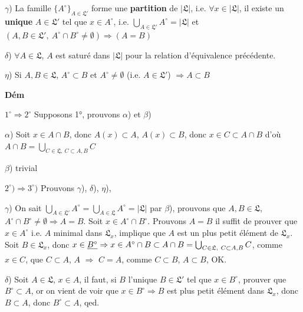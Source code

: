 \documentclass[11pt,a4paper]{article}
\begin{document}
$\gamma$) La famille $\{A^{\circ}\}_{A \in \mathfrak{L}'}$ forme une \textbf{partition} de $|\mathfrak{L}|$, i.e. $\forall x \in |\mathfrak{L}|$, \struck{$\exists$} il existe un \textbf{unique} $A \in \mathfrak{L}'$ tel que $x \in A^{\circ}$, i.e. $\bigcup_{A \in \mathfrak{L}'} A^{\circ} = |\mathfrak{L}|$ et $(A, B \in \mathfrak{L}',\ A^{\circ} \cap B^{\circ} \neq \emptyset) \Rightarrow (A = B)$

$\delta$)  $\forall A \in \mathfrak{L}$, $A$ est saturé dans $|\mathfrak{L}|$ pour la relation d'équivalence précédente.

$\eta$) Si $A, B \in \mathfrak{L}$, $A^{\circ} \subset B$ et $A^{\circ} \neq \emptyset$ (i.e. $A \in \mathfrak{L}'$) $\Rightarrow A \subset B$


\textbf{Dém}

$1^{\circ} \Rightarrow 2^{\circ}$ Supposons 1°, prouvons $\alpha$) et $\beta$)

$\alpha$) Soit $x \in A \cap B$, donc $A(x) \subset A$, $A(x) \subset B$, donc $x \in C \subset A \cap B$ d'où $A \cap B = \bigcup_{C \in \mathfrak{L},\ C \subset A, B} C$

$\beta$) trivial

$2^{\circ}) \Rightarrow 3^{\circ})$ Prouvons $\gamma$), $\delta$), $\eta$),

$\gamma$) On sait $\bigcup_{A \in \mathfrak{L}'} A^{\circ} = \bigcup_{A \in \mathfrak{L}} A^{\circ} = |\mathfrak{L}|$ par $\beta$), prouvons que $A, B \in \mathfrak{L}$, $A^{\circ} \cap B^{\circ} \neq \emptyset \Rightarrow A = B$. Soit $x \in A^{\circ} \cap B^{\circ}$. Prouvons $A = B$ il suffit de prouver que $x \in A^{\circ}$  i.e. $A$ minimal dans $\mathfrak{L}_x$, implique que $A$ est un plus petit élément de $\mathfrak{L}_x$. Soit $B \in \mathfrak{L}_x$, donc $x \in \struck{B^{\circ}} \Rightarrow x \in A^{\circ} \cap B \subset A \cap B = \bigcup_{C \in \mathfrak{L},\ C \subset A, B} C$, comme $x \in C$, que $C \subset A$,  $A$ $\Rightarrow$ $C = A$, comme $C \subset B$,  $A \subset B$, OK.

$\delta$) Soit $A \in \mathfrak{L}$, $x \in A$,  il faut, si $B$ l'unique $B \in \mathfrak{L}'$ tel que $x \in B^{\circ}$, prouver que $B^{\circ} \subset A$, or on vient de voir que  $x \in B^{\circ} \Rightarrow B$ est plus petit élément dans $\mathfrak{L}_x$, donc  $B \subset A$, donc $B^{\circ} \subset A$, qed.
\end{document}
